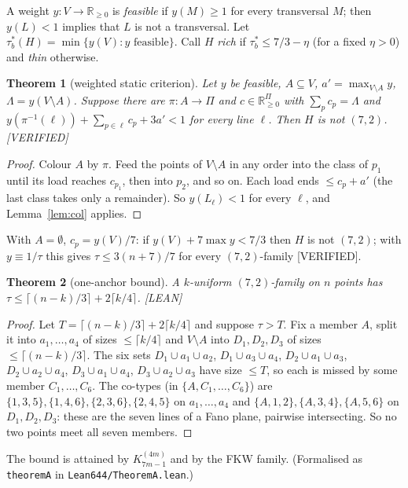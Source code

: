 \documentclass[11pt]{article}
\newtheorem{theorem}{Theorem}[section]
\theoremstyle{definition}
\newcommand{\st}[1]{\textsf{\small[#1]}}
\begin{document}
A weight $y:V\to\mathbb R_{\ge0}$ is \emph{feasible} if $y(M)\ge1$ for every transversal $M$; then $y(L)<1$ implies that
$L$ is not a transversal. Let $\tau^*_b(H)=\min\{y(V):y\text{ feasible}\}$. Call $H$ \emph{rich} if
$\tau^*_b\le7/3-\eta$ (for a fixed $\eta>0$) and \emph{thin} otherwise.

\begin{theorem}[weighted static criterion]\label{thm:3H}
Let $y$ be feasible, $A\subseteq V$, $a'=\max_{V\setminus A}y$, $\Lambda=y(V\setminus A)$. Suppose there are
$\pi:A\to\Pi$ and $c\in\mathbb R^\Pi_{\ge0}$ with $\sum_pc_p=\Lambda$ and $y(\pi^{-1}(\ell))+\sum_{p\in\ell}c_p+3a'<1$
for every line $\ell$. Then $H$ is not $(7,2)$. \st{VERIFIED}
\end{theorem}
\begin{proof}
Colour $A$ by $\pi$. Feed the points of $V\setminus A$ in any order into the class of $p_1$ until its load reaches
$c_{p_1}$, then into $p_2$, and so on. Each load ends $\le c_p+a'$ (the last class takes only a remainder). So
$y(L_\ell)<1$ for every $\ell$, and Lemma~\ref{lem:col} applies.
\end{proof}
With $A=\emptyset$, $c_p=y(V)/7$: if $y(V)+7\max y<7/3$ then $H$ is not $(7,2)$; with $y\equiv1/\tau$ this gives
$\tau\le3(n+7)/7$ for every $(7,2)$-family \st{VERIFIED}.

\begin{theorem}[one-anchor bound]\label{thm:A}
A $k$-uniform $(7,2)$-family on $n$ points has $\tau\le\lceil(n-k)/3\rceil+2\lceil k/4\rceil$. \st{LEAN}
\end{theorem}
\begin{proof}
Let $T=\lceil(n-k)/3\rceil+2\lceil k/4\rceil$ and suppose $\tau>T$. Fix a member $A$, split it into $a_1,\dots,a_4$
of sizes $\le\lceil k/4\rceil$ and $V\setminus A$ into $D_1,D_2,D_3$ of sizes $\le\lceil(n-k)/3\rceil$. The six sets
$D_1\cup a_1\cup a_2$, $D_1\cup a_3\cup a_4$, $D_2\cup a_1\cup a_3$, $D_2\cup a_2\cup a_4$, $D_3\cup a_1\cup a_4$,
$D_3\cup a_2\cup a_3$ have size $\le T$, so each is missed by some member $C_1,\dots,C_6$. The co-types (in
$\{A,C_1,\dots,C_6\}$) are $\{1,3,5\},\{1,4,6\},\{2,3,6\},\{2,4,5\}$ on $a_1,\dots,a_4$ and $\{A,1,2\},\{A,3,4\},
\{A,5,6\}$ on $D_1,D_2,D_3$: these are the seven lines of a Fano plane, pairwise intersecting. So no two points meet all
seven members.
\end{proof}
The bound is attained by $K^{(4m)}_{7m-1}$ and by the FKW family. (Formalised as \texttt{theoremA} in
\texttt{Lean644/TheoremA.lean}.)
\end{document}
